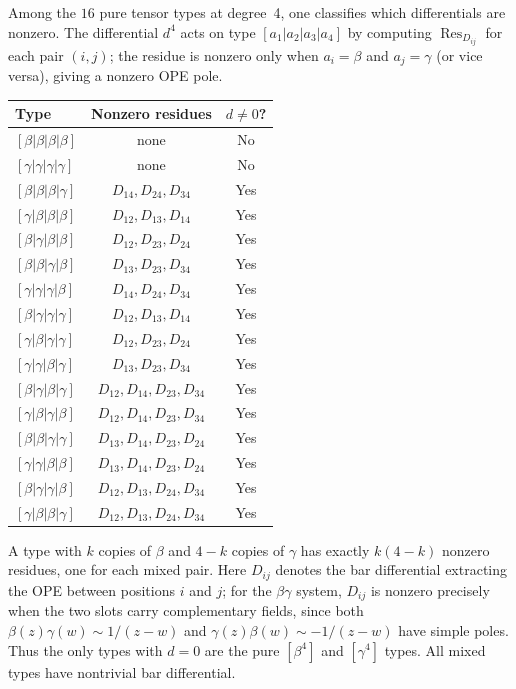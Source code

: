\begin{computation}
\label{comp:degree4-nonzero-types}
Among the $16$ pure tensor types at degree~4, one classifies which
differentials are nonzero.  The differential $d^4$ acts on type
$[a_1|a_2|a_3|a_4]$ by computing $\operatorname{Res}_{D_{ij}}$
for each pair $(i,j)$; the residue is nonzero only when $a_i = \beta$
and $a_j = \gamma$ (or vice versa), giving a nonzero OPE pole.

\begin{center}
\begin{tabular}{lcc}
\toprule
Type & Nonzero residues & $d \neq 0$? \\
\midrule
$[\beta|\beta|\beta|\beta]$ & none & No \\
$[\gamma|\gamma|\gamma|\gamma]$ & none & No \\
$[\beta|\beta|\beta|\gamma]$ & $D_{14}, D_{24}, D_{34}$ & Yes \\
$[\gamma|\beta|\beta|\beta]$ & $D_{12}, D_{13}, D_{14}$ & Yes \\
$[\beta|\gamma|\beta|\beta]$ & $D_{12}, D_{23}, D_{24}$ & Yes \\
$[\beta|\beta|\gamma|\beta]$ & $D_{13}, D_{23}, D_{34}$ & Yes \\
$[\gamma|\gamma|\gamma|\beta]$ & $D_{14}, D_{24}, D_{34}$ & Yes \\
$[\beta|\gamma|\gamma|\gamma]$ & $D_{12}, D_{13}, D_{14}$ & Yes \\
$[\gamma|\beta|\gamma|\gamma]$ & $D_{12}, D_{23}, D_{24}$ & Yes \\
$[\gamma|\gamma|\beta|\gamma]$ & $D_{13}, D_{23}, D_{34}$ & Yes \\
$[\beta|\gamma|\beta|\gamma]$ & $D_{12}, D_{14}, D_{23}, D_{34}$ & Yes \\
$[\gamma|\beta|\gamma|\beta]$ & $D_{12}, D_{14}, D_{23}, D_{34}$ & Yes \\
$[\beta|\beta|\gamma|\gamma]$ & $D_{13}, D_{14}, D_{23}, D_{24}$ & Yes \\
$[\gamma|\gamma|\beta|\beta]$ & $D_{13}, D_{14}, D_{23}, D_{24}$ & Yes \\
$[\beta|\gamma|\gamma|\beta]$ & $D_{12}, D_{13}, D_{24}, D_{34}$ & Yes \\
$[\gamma|\beta|\beta|\gamma]$ & $D_{12}, D_{13}, D_{24}, D_{34}$ & Yes \\
\bottomrule
\end{tabular}
\end{center}
A type with $k$ copies of $\beta$ and $4-k$ copies of $\gamma$ has exactly
$k(4-k)$ nonzero residues, one for each mixed pair.  Here $D_{ij}$
denotes the bar differential extracting the OPE between positions $i$
and $j$; for the $\beta\gamma$ system, $D_{ij}$ is nonzero precisely
when the two slots carry complementary fields, since both
$\beta(z)\gamma(w) \sim 1/(z-w)$ and
$\gamma(z)\beta(w) \sim -1/(z-w)$ have simple poles.
Thus the only types with $d = 0$ are the pure $[\beta^4]$ and
$[\gamma^4]$ types.  All mixed types have nontrivial bar differential.
\end{computation}

